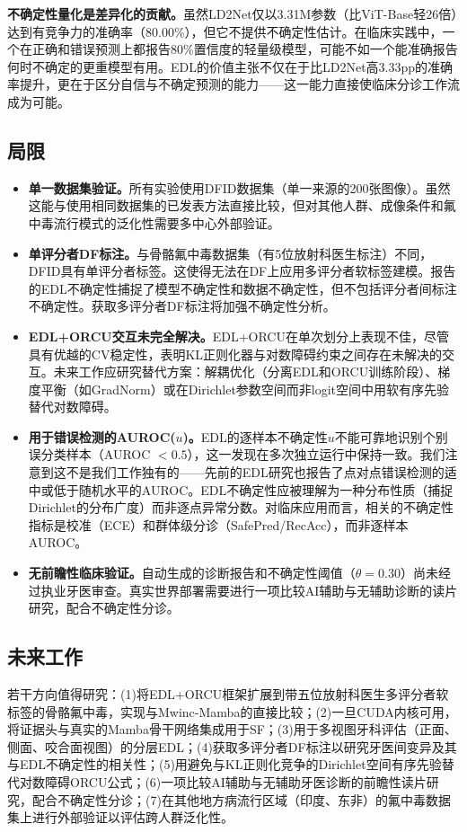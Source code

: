 \documentclass[12pt,a4paper]{ctexart}
\begin{document}
\textbf{不确定性量化是差异化的贡献。}虽然LD2Net仅以3.31M参数（比ViT-Base轻26倍）达到有竞争力的准确率（80.00\%），但它不提供不确定性估计。在临床实践中，一个在正确和错误预测上都报告80\%置信度的轻量级模型，可能不如一个能准确报告何时不确定的更重模型有用。EDL的价值主张不仅在于比LD2Net高3.33pp的准确率提升，更在于区分自信与不确定预测的能力——这一能力直接使临床分诊工作流成为可能。

\subsection{局限}

\begin{itemize}
    \item \textbf{单一数据集验证。}所有实验使用DFID数据集（单一来源的200张图像）。虽然这能与使用相同数据集的已发表方法直接比较，但对其他人群、成像条件和氟中毒流行模式的泛化性需要多中心外部验证。
    \item \textbf{单评分者DF标注。}与骨骼氟中毒数据集（有5位放射科医生标注）不同，DFID具有单评分者标签。这使得无法在DF上应用多评分者软标签建模。报告的EDL不确定性捕捉了模型不确定性和数据不确定性，但不包括评分者间标注不确定性。获取多评分者DF标注将加强不确定性分析。
    \item \textbf{EDL+ORCU交互未完全解决。}EDL+ORCU在单次划分上表现不佳，尽管具有优越的CV稳定性，表明KL正则化器与对数障碍约束之间存在未解决的交互。未来工作应研究替代方案：解耦优化（分离EDL和ORCU训练阶段）、梯度平衡（如GradNorm）或在Dirichlet参数空间而非logit空间中用软有序先验替代对数障碍。
    \item \textbf{用于错误检测的AUROC($u$)。}EDL的逐样本不确定性$u$不能可靠地识别个别误分类样本（AUROC $< 0.5$），这一发现在多次独立运行中保持一致。我们注意到这不是我们工作独有的——先前的EDL研究也报告了点对点错误检测的适中或低于随机水平的AUROC。EDL不确定性应被理解为一种分布性质（捕捉Dirichlet的分布广度）而非逐点异常分数。对临床应用而言，相关的不确定性指标是校准（ECE）和群体级分诊（SafePred/RecAcc），而非逐样本AUROC。
    \item \textbf{无前瞻性临床验证。}自动生成的诊断报告和不确定性阈值（$\theta = 0.30$）尚未经过执业牙医审查。真实世界部署需要进行一项比较AI辅助与无辅助诊断的读片研究，配合不确定性分诊。
\end{itemize}

\subsection{未来工作}

若干方向值得研究：(1)将EDL+ORCU框架扩展到带五位放射科医生多评分者软标签的骨骼氟中毒，实现与Mwinc-Mamba的直接比较；(2)一旦CUDA内核可用，将证据头与真实的Mamba骨干网络集成用于SF；(3)用于多视图牙科评估（正面、侧面、咬合面视图）的分层EDL；(4)获取多评分者DF标注以研究牙医间变异及其与EDL不确定性的相关性；(5)用避免与KL正则化竞争的Dirichlet空间有序先验替代对数障碍ORCU公式；(6)一项比较AI辅助与无辅助牙医诊断的前瞻性读片研究，配合不确定性分诊；(7)在其他地方病流行区域（印度、东非）的氟中毒数据集上进行外部验证以评估跨人群泛化性。
\end{document}
